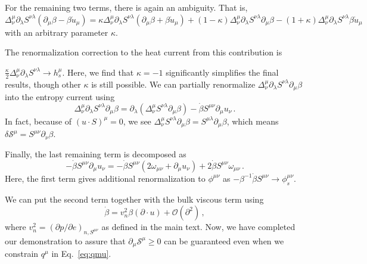 \documentclass[prl,superscriptaddress,twocolumn,
  showpacs,preprintnumbers,amsmath,amssymb]{revtex4-1}
\begin{document}
For the remaining two terms, there is again an ambiguity.  That is, $\Delta^\mu_\nu \partial_\lambda S^{\nu\lambda}(\partial_\mu \beta - \beta\dot{u}_\mu
) = \kappa\Delta^\mu_\nu\partial_\lambda S^{\nu\lambda}(\partial_\mu\beta + \beta\dot{u}_\mu) + (1-\kappa)\Delta^\mu_\nu \partial_\lambda S^{\nu\lambda}\partial_\mu\beta  -  (1+\kappa)\Delta^\mu_\nu \partial_\lambda S^{\nu\lambda} \beta\dot{u}_\mu$ with an arbitrary parameter $\kappa$.







The renormalization correction to the heat current from this contribution is




$\frac{\kappa}{2}\Delta^\mu_\nu\partial_\lambda S^{\nu\lambda} \to h_s^\mu$.
Here, we find that $\kappa=-1$ significantly simplifies the final results, though other $\kappa$ is still possible.
We can partially renormalize $\Delta^\mu_\nu \partial_\lambda S^{\nu\lambda} \partial_\mu \beta$ into the entropy current using
\begin{equation}
  \Delta^\mu_\nu \partial_\lambda S^{\nu\lambda} \partial_\mu \beta
  = \partial_\lambda (\Delta_\nu^\mu S^{\nu\lambda}\partial_\mu\beta)
    - \dot{\beta} S^{\mu\nu} \partial_{\mu} u_{\nu}\,.
\end{equation}
In fact, because of $(u\cdot S)^\mu=0$, we see
$\Delta^\mu_\nu S^{\nu\lambda}\partial_\mu\beta = S^{\mu\lambda}\partial_\mu\beta$, which means
$\delta\mathcal{S}^\mu = S^{\mu\nu} \partial_\nu\beta$.




Finally, the last remaining term is decomposed as
\begin{equation}
  - \dot{\beta} S^{\mu\nu} \partial_{\mu} u_{\nu}
  = -\dot{\beta} S^{\mu\nu} (2\omega_{\mu\nu} + \partial_\mu u_\nu)
    + 2\dot{\beta} S^{\mu\nu}\omega_{\mu\nu}\,.
\end{equation}
Here, the first term gives additional renormalization to $\phi^{\mu\nu}$ as
$-\beta^{-1}\dot{\beta} S^{\mu\nu}\to \phi_s^{\mu\nu}$.




We can put the second term together with the bulk viscous term using
\begin{equation}
  \dot{\beta} = v_n^2 \beta (\partial\cdot u) + \mathcal{O}(\partial^2)\,,
\end{equation}
where $v_n^2=(\partial p/\partial e)_{n,S^{\mu\nu}}$ as defined in the main text.
Now, we have completed our demonstration to assure that $\partial_\mu \mathcal{S}^\mu\ge 0$ can be guaranteed even when we constrain $q^\mu$ in Eq.~\eqref{eq:qmu}.
\end{document}
